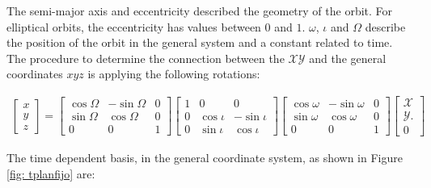 The semi-major axis and eccentricity described the geometry of the orbit. For elliptical orbits, the eccentricity has values between $0$ and $1$. $\omega$, $\iota$ and $\Omega$ describe the position of the orbit in the general system and a constant related to time.\\

The procedure to determine the connection between the $\mathcal{X}\mathcal{Y}$ and the general coordinates $xyz$ is applying the following rotations:

\begin{align}
\begin{bmatrix}
x\\
y\\
z\end{bmatrix}
= 
\begin{bmatrix}
\cos \Omega & -\sin \Omega & 0 \\
\sin \Omega & \cos\Omega & 0\\
0&0&1
\end{bmatrix}
\begin{bmatrix}
1&0&0\\
0&\cos \iota & -\sin \iota \\
0& \sin \iota & \cos\iota 
\end{bmatrix}
\begin{bmatrix}
\cos \omega & -\sin {\omega} & 0 \\
\sin \omega & \cos\omega & 0\\
0&0&1
\end{bmatrix}
\begin{bmatrix}
\mathcal{X}\\
\mathcal{Y}.\\
0\end{bmatrix}
\end{align}

The time dependent basis, in the general coordinate system, as shown in Figure \ref{fig: tplanfijo} are:\\

